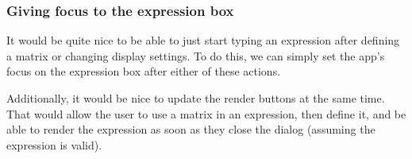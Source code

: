 \documentclass[../development.tex]{subfiles}
\begin{document}
\subsubsection{Giving focus to the expression box\label{development:fixing-bugs-and-adding-polish:giving-focus-to-the-expression-box}}

It would be quite nice to be able to just start typing an expression after defining a matrix or changing display settings. To do this, we can simply set the app's focus on the expression box after either of these actions.

Additionally, it would be nice to update the render buttons at the same time. That would allow the user to use a matrix in an expression, then define it, and be able to render the expression as soon as they close the dialog (assuming the expression is valid).

\end{document}
